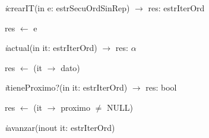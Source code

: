 \textit{i}crearIT(in e: estrSecuOrdSinRep) $\longrightarrow$ res: estrIterOrd\\
\begin{algorithm}[H]
res $\leftarrow$ e
\end{algorithm}

\textit{i}actual(in it: estrIterOrd) $\longrightarrow$ res: $\alpha$\\
\begin{algorithm}[H]
res $\leftarrow$ (it $\rightarrow$ dato)
\end{algorithm}

\textit{i}tieneProximo?(in it: estrIterOrd) $\longrightarrow$ res: bool\\
\begin{algorithm}[H]
res $\leftarrow$ (it $\rightarrow$ proximo $\neq$ NULL)
\end{algorithm}

\textit{i}avanzar(inout it: estrIterOrd)\\
\begin{algorithm}[H]
\end{algorithm}
